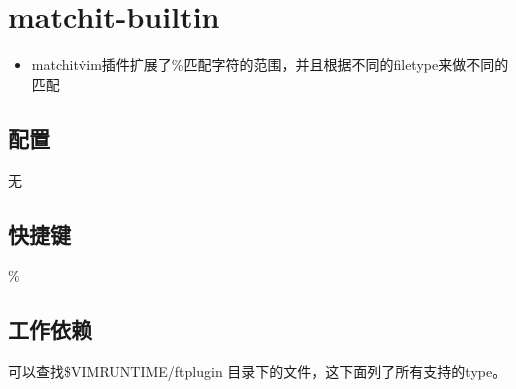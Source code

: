 \chapter{matchit-builtin}
\begin{itemize}
    \item matchit\.vim插件扩展了\%匹配字符的范围，并且根据不同的filetype来做不同的匹配
\end{itemize}

\section{配置}
无

\section{快捷键}
\%

\section{工作依赖}
可以查找\$VIMRUNTIME/ftplugin 目录下的文件，这下面列了所有支持的type。

\newpage
